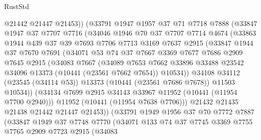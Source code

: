 \begin{lexlean}{RustStd}
\begin{coremodule}
              @21442
              @21447
              @21453))
          (@33791
            @1947
            @1957
            @37
            @71
            @7718
            @7888
            (@33847
              @1947
              @37
              @7707
              @7716
              (@34046
                @1946
                @70
                @37
                @7707
                @7714
                @4674
                (@33863
                  @1944
                  @439
                  @37
                  @39
                  @7693
                  @7706
                  @7713
                  @3169
                  @7637
                  @2915
                  (@33847
                    @1944
                    @37
                    @7670
                    @7691
                    (@34071
                      @53
                      @74
                      @37
                      @7667
                      @3369
                      @7677
                      @7686
                      @2909
                      @7645
                      @2915
                      (@34083
                        @7667
                        (@34089
                          @7653
                          @7662
                          @33896
                          @33488
                          @23542
                          @34096
                          @13373
                          (@10441 (@23561 @7662 @7654))
                          @10534))
                      @34108
                      @34112
                      (@23545 (@34114 @53))
                      @13373
                      (@10441 (@23561 @7686 @7678))
                      @11503
                      @10534))
                  (@34134 @7699 @2915 @34143 @33967 @11952 (@10441 (@11954 @7700 @2940)))
                  @11952
                  (@10441 (@11954 @7638 @7706)))
                @21432
                @21435
                @21438
                @21442
                @21447
                @21453))
            (@33791
              @1949
              @1956
              @37
              @70
              @7772
              @7887
              (@33847
                @1949
                @37
                @7748
                @7770
                (@34071
                  @133
                  @74
                  @37
                  @7745
                  @3369
                  @7755
                  @7765
                  @2909
                  @7723
                  @2915
                  (@34083

\end{coremodule}
\end{lexlean}
